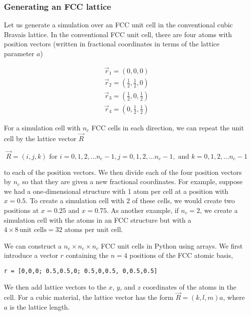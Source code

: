 \documentclass[11pt]{article}
\begin{document}
    \hypertarget{generating-an-fcc-lattice}{%
\subsubsection{Generating an FCC
lattice}\label{generating-an-fcc-lattice}}

Let us generate a simulation over an FCC unit cell in the conventional
cubic Bravais lattice. In the conventional FCC unit cell, there are four
atoms with position vectors (written in fractional coordinates in terms
of the lattice parameter \(a\))

\begin{equation}
\begin{aligned}
\vec{r}_1 = (0,0,0) \\
\vec{r}_2 =(\frac{1}{2},\frac{1}{2},0) \\
\vec{r}_3 =(\frac{1}{2},0,\frac{1}{2}) \\
\vec{r}_4 = (0,\frac{1}{2},\frac{1}{2})
\end{aligned}
\end{equation}

For a simulation cell with \(n_c\) FCC cells in each direction, we can
repeat the unit cell by the lattice vector \(\vec{R}\)

\begin{equation}
\vec{R} = (i,j,k) \text{ for } i = 0,1,2,... n_c-1, j = 0,1,2,...n_c-1, \text{ and } k = 0,1,2,...n_c-1
\end{equation}

to each of the position vectors. We then divide each of the four
position vectors by \(n_c\) so that they are given a new fractional
coordinates. For example, suppose we had a one-dimensional structure
with 1 atom per cell at a position with \(x = 0.5\). To create a
simulation cell with 2 of these cells, we would create two positions at
\(x = 0.25\) and \(x = 0.75\). As another example, if \(n_c = 2\), we
create a simulation cell with the atoms in an FCC structure but with a
\(4 \times 8 \,\text{unit cells}= 32\) atoms per unit cell.

We can construct a \(n_c \times n_c \times n_c\) FCC unit cells in
Python using arrays. We first introduce a vector \(r\) containing the
\(n=4\) positions of the FCC atomic basis,

\begin{verbatim}
r = [0,0,0; 0.5,0.5,0; 0.5,0,0.5, 0,0.5,0.5]
\end{verbatim}

We then add lattice vectors to the \(x\), \(y\), and \(z\) coordinates
of the atoms in the cell. For a cubic material, the lattice vector has
the form \(\vec{R} = (k,l,m)a\), where \(a\) is the lattice length.
\end{document}
